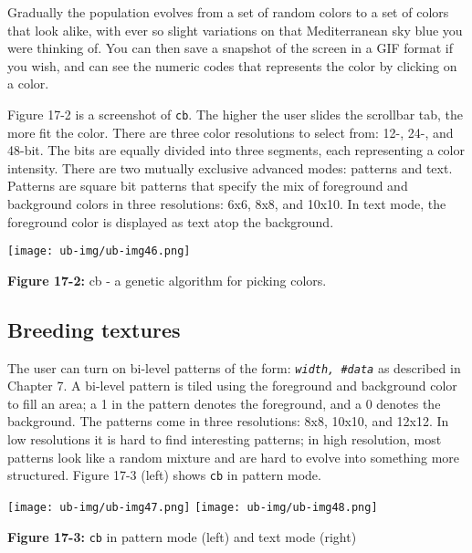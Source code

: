 Gradually the population evolves from a set of random colors to a set of
colors that look alike, with ever so slight variations on that
Mediterranean sky blue you were thinking of. You can then save a
snapshot of the screen in a GIF format if you wish, and can see the
numeric codes that represents the color by clicking on a color.

Figure 17-2 is a screenshot of \texttt{cb}. The higher the user
slides the scrollbar tab, the more fit the color. There are three
color resolutions to select from: 12-, 24-, and 48-bit.
The bits are equally divided into three segments, each representing a
color intensity. There are two mutually exclusive advanced modes:
patterns and text. Patterns are square bit patterns that specify the
mix of foreground and background colors in three
resolutions: 6x6, 8x8, and 10x10. In text mode, the
foreground color is displayed as text atop the background.

\begin{center}
\texttt{[image: ub-img/ub-img46.png]}
\end{center}

{\sffamily\bfseries Figure 17-2:}
{\sffamily cb - a genetic algorithm for picking colors.}



\subsection*{Breeding textures}

The user can turn on bi-level patterns of the form: \texttt{\textit{width,
\#data}} as described in Chapter 7. A bi-level pattern is tiled using
the foreground and background color to fill an area; a 1 in the
pattern denotes the foreground, and a 0 denotes the background. The
patterns come in three resolutions: 8x8, 10x10,
and 12x12. In low resolutions it is hard to find interesting patterns;
in high resolution, most patterns look like a random mixture and are
hard to evolve into something more structured. Figure 17-3 (left) shows
\texttt{cb} in pattern mode.

\bigskip

\noindent \texttt{[image: ub-img/ub-img47.png]}
\texttt{[image: ub-img/ub-img48.png]}

{\sffamily\bfseries Figure 17-3:}
{\sffamily \texttt{cb} in pattern mode (left) and text mode (right)}

\bigskip


